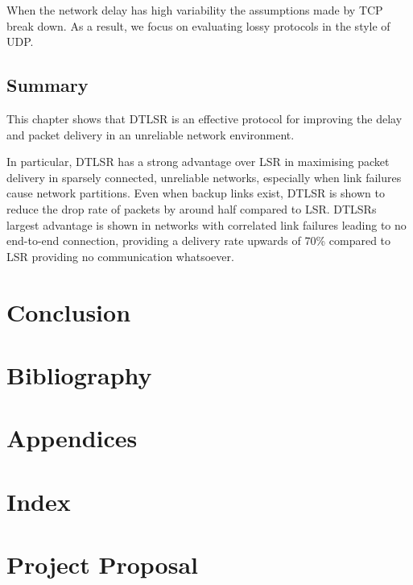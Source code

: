 \documentclass[withindex,glossary,openany]{cam-thesis}
\begin{document}
When the network delay has high variability the assumptions made by TCP break down. As a result, we focus on evaluating lossy protocols in the style of UDP.

\section{Summary}

This chapter shows that DTLSR is an effective protocol for improving the delay and packet delivery in an unreliable network environment.

In particular, DTLSR has a strong advantage over LSR in maximising packet delivery in sparsely connected, unreliable networks, especially when link failures cause network partitions. Even when backup links exist, DTLSR is shown to reduce the drop rate of packets by around half compared to LSR. DTLSRs largest advantage is shown in networks with correlated link failures leading to no end-to-end connection, providing a delivery rate upwards of 70\% compared to LSR providing no communication whatsoever.

\chapter{Conclusion}

\chapter{Bibliography}

\chapter{Appendices}

\chapter{Index}

\chapter{Project Proposal}




\printthesisindex
\end{document}
